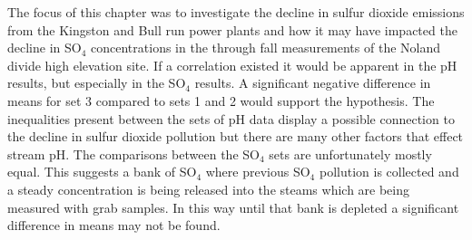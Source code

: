 The focus of this chapter was to investigate the decline in sulfur dioxide emissions from the Kingston and Bull run power plants and how it may have impacted the decline in SO$_4$  concentrations in the through fall measurements of the Noland divide high elevation site.
If a correlation existed it would be apparent in the pH results, but especially in the SO$_4$ results.
A significant negative difference in means for set 3 compared to sets 1 and 2 would support the hypothesis.
The inequalities present between the sets of pH data display a possible connection to the decline in sulfur dioxide pollution but there are many other factors that effect stream pH.
The comparisons between the SO$_4$ sets are unfortunately mostly equal.
This suggests a bank of SO$_4$ where previous SO$_4$ pollution is collected and a steady concentration is being released into the steams which are being measured with grab samples.
In this way until that bank is depleted a significant difference in means may not be found.

